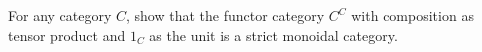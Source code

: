 For any category $C$, show that the functor category $C^C$ with composition as tensor product and $1_C$ as the unit is a strict monoidal category.
